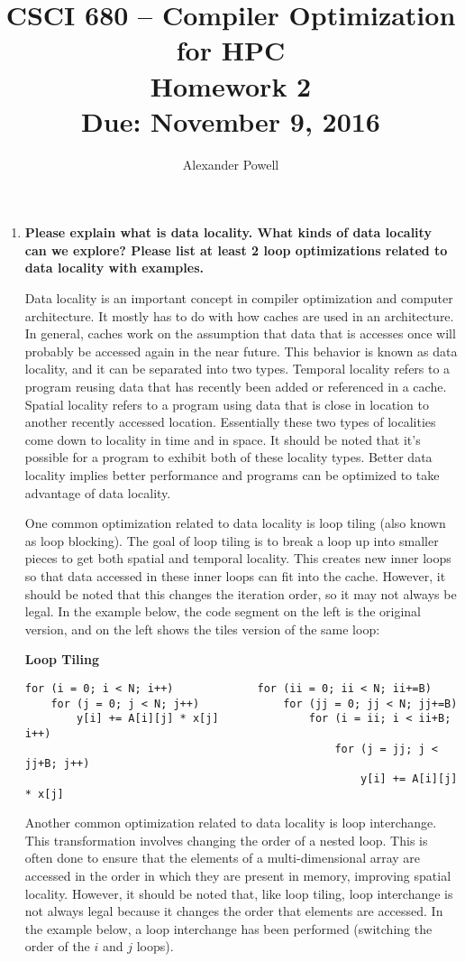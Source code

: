 \documentclass[10pt]{article} %
\title{CSCI 680 -- Compiler Optimization for HPC \\
Homework 2 \\
{\large{\bf Due: November 9, 2016}}}
\date{}
\author{Alexander Powell}
\begin{document}
\maketitle
\begin{enumerate}

\item %
\textbf{Please explain what is data locality.  What kinds of data locality can we explore?  Please list at least 2 loop optimizations related to data locality with examples.  }

\setlength{\parindent}{8ex}
Data locality is an important concept in compiler optimization and computer architecture.  It mostly has to do with how caches are used in an architecture.  In general, caches work on the assumption that data that is accesses once will probably be accessed again in the near future.  This behavior is known as data locality, and it can be separated into two types.  Temporal locality refers to a program reusing data that has recently been added or referenced in a cache.  Spatial locality refers to a program using data that is close in location to another recently accessed location.  Essentially these two types of localities come down to locality in time and in space.  It should be noted that it's possible for a program to exhibit both of these locality types.  Better data locality implies better performance and programs can be optimized to take advantage of data locality.  

One common optimization related to data locality is loop tiling (also known as loop blocking).  The goal of loop tiling is to break a loop up into smaller pieces to get both spatial and temporal locality.  This creates new inner loops so that data accessed in these inner loops can fit into the cache.  However, it should be noted that this changes the iteration order, so it may not always be legal.  In the example below, the code segment on the left is the original version, and on the left shows the tiles version of the same loop:

\textbf{Loop Tiling}
\begin{verbatim}
for (i = 0; i < N; i++)             for (ii = 0; ii < N; ii+=B)
    for (j = 0; j < N; j++)             for (jj = 0; jj < N; jj+=B)
        y[i] += A[i][j] * x[j]              for (i = ii; i < ii+B; i++)
                                                for (j = jj; j < jj+B; j++)
                                                    y[i] += A[i][j] * x[j]
\end{verbatim}

Another common optimization related to data locality is loop interchange.  This transformation involves changing the order of a nested loop.  This is often done to ensure that the elements of a multi-dimensional array are accessed in the order in which they are present in memory, improving spatial locality.  However, it should be noted that, like loop tiling, loop interchange is not always legal because it changes the order that elements are accessed.  In the example below, a loop interchange has been performed (switching the order of the $i$ and $j$ loops).  


\end{enumerate}
\end{document}
